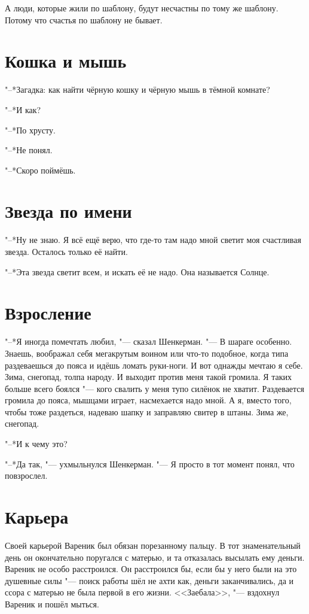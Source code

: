 А люди, которые жили по шаблону, будут несчастны по тому же шаблону.
Потому что счастья по шаблону не бывает.

\section{Кошка и мышь}

"--*Загадка: как найти чёрную кошку и чёрную мышь в тёмной комнате?

"--*И как?

"--*По хрусту.

"--*Не понял.

"--*Скоро поймёшь.

\section{Звезда по имени}

"--*Ну не знаю.
Я всё ещё верю, что где-то там надо мной светит моя счастливая звезда.
Осталось только её найти.

"--*Эта звезда светит всем, и искать её не надо.
Она называется Солнце.

\section{Взросление}

"--*Я иногда помечтать любил, "--- сказал Шенкерман.
"--- В шараге особенно. 
Знаешь, воображал себя мегакрутым воином или что-то подобное, когда типа раздеваешься до пояса и идёшь ломать руки-ноги.
И вот однажды мечтаю я себе.
Зима, снегопад, толпа народу.
И выходит против меня такой громила.
Я таких больше всего боялся "--- кого свалить у меня тупо силёнок не хватит.
Раздевается громила до пояса, мышцами играет, насмехается надо мной.
А я, вместо того, чтобы тоже раздеться, надеваю шапку и заправляю свитер в штаны.
Зима же, снегопад.

"--*И к чему это?

"--*Да так, "--- ухмыльнулся Шенкерман.
"--- Я просто в тот момент понял, что повзрослел.

\section{Карьера}

Своей карьерой Вареник был обязан порезанному пальцу.
В тот знаменательный день он окончательно поругался с матерью, и та отказалась высылать ему деньги.
Вареник не особо расстроился.
Он расстроился бы, если бы у него были на это душевные силы "--- поиск работы шёл не ахти как, деньги заканчивались, да и ссора с матерью не была первой в его жизни.
<<Заебала>>, "--- вздохнул Вареник и пошёл мыться.

